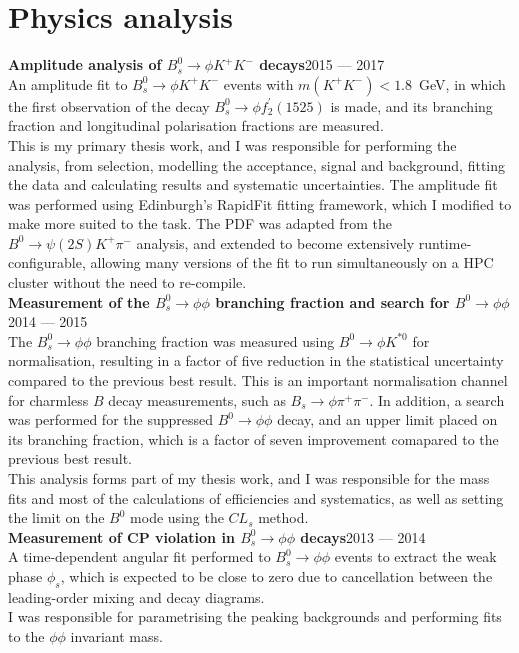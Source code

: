 \documentclass{simplecv}
\newcommand\dateditem[2]{#1\hfill#2\\}
\newcommand\topictitle[3]{\dateditem{{\textbf{#1}}}{#3}#2}
\begin{document}
	\section{Physics analysis}
	\topictitle{Amplitude analysis of $B^0_s \to \phi K^{+}K^{-}$ decays}{}{2015 --- 2017}
	An amplitude fit to ${B^0_s \to \phi K^{+}K^{-}}$ events with ${m(K^{+}K^{-})<1.8}$~GeV, in which the first observation of the decay ${B^0_s \to \phi f_2^\prime(1525)}$ is made, and its branching fraction and longitudinal polarisation fractions are measured.
	\\[0.5em]
	This is my primary thesis work, and I was responsible for performing the analysis, from selection, modelling the acceptance, signal and background, fitting the data and calculating results and systematic uncertainties.
	The amplitude fit was performed using Edinburgh's RapidFit fitting framework, which I modified to make more suited to the task.
	The PDF was adapted from the $B^0 \to \psi(2S) K^{+} \pi^{-}$ analysis, and extended to become extensively runtime-configurable, allowing many versions of the fit to run simultaneously on a HPC cluster without the need to re-compile.
	\\[0.5em]
	\topictitle{Measurement of the $B^0_s \to \phi\phi$ branching fraction and search for $B^0 \to \phi \phi$}{}{2014 --- 2015}
	The $B^0_s \to \phi\phi$ branching fraction was measured using $B^0 \to \phi K^{*0}$ for normalisation, resulting in a factor of five reduction in the statistical uncertainty compared to the previous best result.
	This is an important normalisation channel for charmless $B$ decay measurements, such as $B_s \to \phi \pi^{+} \pi^{-}$.
	In addition, a search was performed for the suppressed $B^0 \to \phi\phi$ decay, and an upper limit placed on its branching fraction, which is a factor of seven improvement comapared to the previous best result.
	\\[0.5em]
	This analysis forms part of my thesis work, and I was responsible for the mass fits and most of the calculations of efficiencies and systematics, as well as setting the limit on the $B^0$ mode using the $CL_s$ method.
	\\[0.5em]
	\topictitle{Measurement of CP violation in $B^0_s \to \phi\phi$ decays}{}{2013 --- 2014}
	A time-dependent angular fit performed to $B^0_s \to \phi\phi$ events to extract the weak phase $\phi_s$, which is expected to be close to zero due to cancellation between the leading-order mixing and decay diagrams.
	\\[0.5em]
	I was responsible for parametrising the peaking backgrounds and performing fits to the $\phi\phi$ invariant mass.
\end{document}
